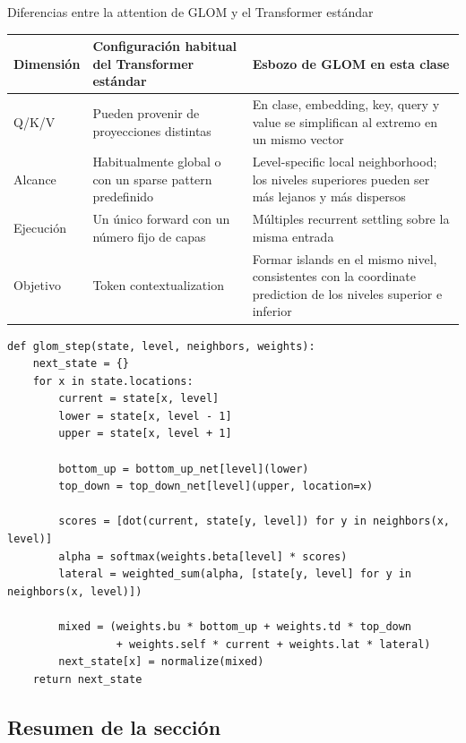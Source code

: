 \documentclass[a4paper]{article}
\begin{document}
\begin{knowledgebox}{Diferencias entre la attention de GLOM y el Transformer estándar}
\begin{tabularx}{\textwidth}{L{0.24\textwidth}L{0.33\textwidth}>{\raggedright\arraybackslash}X}
\toprule
Dimensión & Configuración habitual del Transformer estándar & Esbozo de GLOM en esta clase \\
\midrule
Q/K/V & Pueden provenir de proyecciones distintas & En clase, embedding, key, query y value se simplifican al extremo en un mismo vector \\
Alcance & Habitualmente global o con un sparse pattern predefinido & Level-specific local neighborhood; los niveles superiores pueden ser más lejanos y más dispersos \\
Ejecución & Un único forward con un número fijo de capas & Múltiples recurrent settling sobre la misma entrada \\
Objetivo & Token contextualization & Formar islands en el mismo nivel, consistentes con la coordinate prediction de los niveles superior e inferior \\
\bottomrule
\end{tabularx}
\end{knowledgebox}

\begin{lstlisting}[caption={Pseudocódigo didáctico de una sola settling update de GLOM}]
def glom_step(state, level, neighbors, weights):
    next_state = {}
    for x in state.locations:
        current = state[x, level]
        lower = state[x, level - 1]
        upper = state[x, level + 1]

        bottom_up = bottom_up_net[level](lower)
        top_down = top_down_net[level](upper, location=x)

        scores = [dot(current, state[y, level]) for y in neighbors(x, level)]
        alpha = softmax(weights.beta[level] * scores)
        lateral = weighted_sum(alpha, [state[y, level] for y in neighbors(x, level)])

        mixed = (weights.bu * bottom_up + weights.td * top_down
                 + weights.self * current + weights.lat * lateral)
        next_state[x] = normalize(mixed)
    return next_state
\end{lstlisting}

\subsection{Resumen de la sección}
\end{document}
